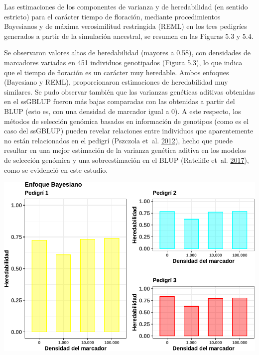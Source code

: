 \documentclass[11pt,spanish,a4paper,oneside,]{book} %
\begin{document}
Las estimaciones de los componentes de varianza y de heredabilidad (en sentido estricto) para el carácter tiempo de floración, mediante procedimientos Bayesianos y de máxima verosimilitud restringida (REML) en los tres pedigríes generados a partir de la simulación ancestral, se resumen en las Figuras 5.3 y 5.4.

Se observaron valores altos de heredabilidad (mayores a 0.58), con densidades de marcadores variadas en 451 individuos genotipados (Figura 5.3), lo que indica que el tiempo de floración es un carácter muy heredable. Ambos enfoques (Bayesiano y REML), proporcionaron estimaciones de heredabilidad muy similares. Se pudo observar también que las varianzas genéticas aditivas obtenidas en el ssGBLUP fueron más bajas comparadas con las obtenidas a partir del BLUP (esto es, con una densidad de marcador igual a 0). A este respecto, los métodos de selección genómica basados en información de genotipos (como es el caso del ssGBLUP) pueden revelar relaciones entre individuos que aparentemente no están relacionados en el pedigrí (Pszczola et~al. \protect\hyperlink{ref-cite:74}{2012}), hecho que puede resultar en una mejor estimación de la varianza genética aditiva en los modelos de selección genómica y una sobreestimación en el BLUP (Ratcliffe et~al. \protect\hyperlink{ref-cite:72}{2017}), como se evidenció en este estudio.

\begin{center}\includegraphics[width=0.94\linewidth]{figures/param_Bayes} \end{center}
\end{document}
